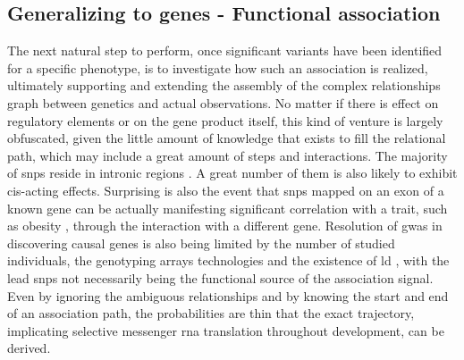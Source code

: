 \subsection{Generalizing to genes - Functional association}
The next natural step to perform, once significant variants have been identified for a specific phenotype, is to investigate how such an association is realized, ultimately supporting and extending the assembly of the complex relationships graph between genetics and actual observations. No matter if there is effect on regulatory elements or on the gene product itself, this kind of venture is largely obfuscated, given the little amount of knowledge that exists to fill the relational path, which may include a great amount of steps and interactions. The majority of \acp{snp} reside in intronic regions \cite{Belmont2003}. A great number of them is also likely to exhibit cis-acting effects. Surprising is also the event that \acp{snp} mapped on an exon of a known gene can be actually manifesting significant correlation with a trait, such as obesity \cite{Claussnitzer2015}, through the interaction with a different gene. Resolution of \ac{gwas} in discovering causal genes is also being limited by the number of studied individuals, the genotyping arrays technologies and the existence of \ac{ld} \cite{Do2017}, with the lead \acp{snp} not necessarily being the functional source of the association signal. Even by ignoring the ambiguous relationships and by knowing the start and end of an association path, the probabilities are thin that the exact trajectory, implicating selective messenger \ac{rna} translation throughout development, can be derived. 

